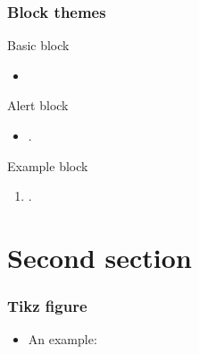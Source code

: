 \documentclass[11pt]{beamer}
\begin{document}
\begin{frame}[t, label=blocktheme]
\frametitle{Block themes}

    \begin{block}{Basic block}
        \begin{itemize}
            \item \lipsum[1][1-2]
        \end{itemize}
    \end{block}
    
    \begin{alertblock}{Alert block}
        \begin{itemize}
            \item \lipsum[1][1-1]\cite{belghazi2018mutual}.
        \end{itemize}
    \end{alertblock}

    \begin{exampleblock}{Example block}
        \begin{enumerate}
            \item \lipsum[1][1-3]\cite{berisha2014empirical}.
        \end{enumerate}
    \end{exampleblock}
\end{frame}

\section{Second section}

\begin{frame}[t, label=tikzfigure]
\frametitle{Tikz figure}
    \begin{itemize}
        \item An example\cite{Thesis2023}:
    \end{itemize}
    
    \begin{center}
        
    \end{center}
\end{frame}
\end{document}
